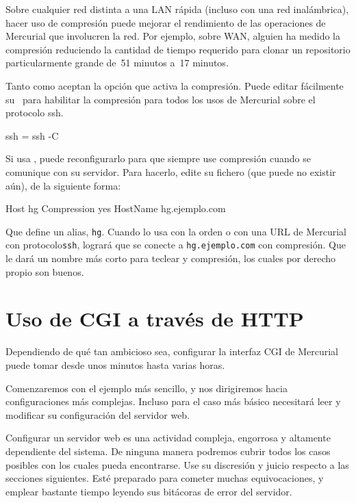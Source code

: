 Sobre cualquier red distinta a una LAN rápida (incluso con una red
inalámbrica), hacer uso de compresión puede mejorar el rendimiento
de las operaciones de Mercurial que involucren la red.  Por ejemplo,
sobre WAN, alguien ha medido la compresión reduciendo la cantidad
de tiempo requerido para clonar un repositorio particularmente
grande de~51 minutos a~17 minutos.

Tanto  como  aceptan la opción
 que activa la compresión.  Puede editar fácilmente
su \hgrc\ para habilitar la compresión para todos los usos de
Mercurial sobre el protocolo ssh.
\begin{codesample2}
  [ui]
  ssh = ssh -C
\end{codesample2}

Si usa , puede reconfigurarlo para que siempre use
compresión cuando se comunique con su servidor.  Para hacerlo,
edite su fichero  (que puede no existir
aún), de la siguiente forma:
\begin{codesample2}
  Host hg
    Compression yes
    HostName hg.ejemplo.com
\end{codesample2}
Que define un alias, \texttt{hg}.  Cuando lo usa con la orden
 o con una URL de Mercurial con protocolo\texttt{ssh},
logrará que  se conecte a \texttt{hg.ejemplo.com}
con compresión.  Que le dará un nombre más corto para teclear y
compresión, los cuales por derecho propio son buenos.

\section{Uso de CGI a través de HTTP}
\label{sec:collab:cgi}

Dependiendo de qué tan ambicioso sea, configurar la interfaz CGI
de Mercurial puede tomar desde unos minutos hasta varias horas.

Comenzaremos con el ejemplo más sencillo, y nos dirigiremos hacia
configuraciones más complejas.  Incluso para el caso más básico
necesitará leer y modificar su configuración del servidor web.

\begin{note}
  Configurar un servidor web es una actividad compleja, engorrosa y
  altamente dependiente del sistema.  De ninguna manera podremos
  cubrir todos los casos posibles con los cuales pueda encontrarse.
  Use su discresión y juicio respecto a las secciones siguientes.
  Esté preparado para cometer muchas equivocaciones, y emplear
  bastante tiempo leyendo sus bitácoras de error del servidor.
\end{note}

